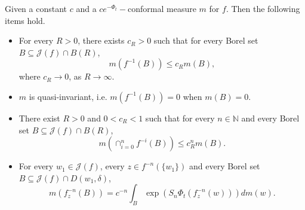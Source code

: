 \documentclass[10pt,a4paper]{amsart}
\begin{document}
\begin{lemma}\label{quasi-invariant}
    Given a constant $c$ and a $ce^{-\Phi_t}-$conformal measure $m$ for $f$. Then the following items hold.
    \begin{itemize}
        \item[(a)] For every $R>0$, there exists $c_R>0$ such that for every Borel set  $B \subseteq \mathcal{J}(f) \cap B(R)$,
    $$m(f^{-1}(B))\leq c_R m(B),$$
    where $c_R \to 0$, as $R\to \infty$.
        \item[(b)]  $m$ is quasi-invariant, i.e. $m(f^{-1}(B))=0$ when $m(B)=0$.
        \item[(c)] There exist $R>0$ and $0<c_R<1$ such that for every $n \in \mathbb{N}$ and every Borel set  $B \subseteq \mathcal{J}(f) \cap B(R)$,
        $$m \left( \cap_{i=0}^{n}f^{-i}(B) \right) \leq c_R^nm(B).$$
        \item[(d)]  For every $w_1\in \mathcal{J}(f)$, every $z\in f^{-n}(\{w_1\})$ and every Borel set  $B \subseteq \mathcal{J}(f) \cap D(w_1,\delta)$,
    $$m(f_z^{-n}(B))= c^{-n}\int_B \exp\left(S_n\Phi_t(f_z^{-n}(w))\right)dm(w).$$
    \end{itemize}
\end{lemma}
\end{document}
